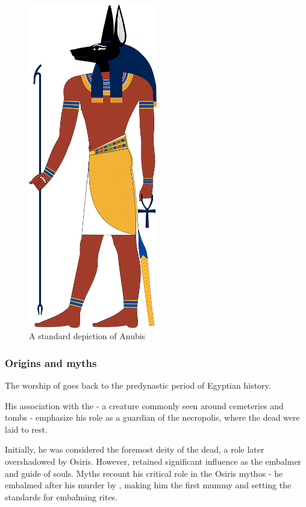 \begin{figure} [H]
	\centering
	\includegraphics[width=0.5\textwidth]{../images/anubis}
	\caption{A standard depiction of Anubis}
\end{figure}

\subsubsection*{Origins and myths}
The worship of  goes back to the predynastic period of Egyptian history.

His association with the  - a creature commonly seen around cemeteries and tombs - emphasize his role as a guardian of the necropolis, where the dead were laid to rest.

Initially, he was considered the foremost deity of the dead, a role later overshadowed by Osiris. However,  retained significant influence as the embalmer and guide of souls. Myths recount his critical role in the Osiris mythos - he embalmed  after his murder by , making him the first mummy and setting the standards for embalming rites.

